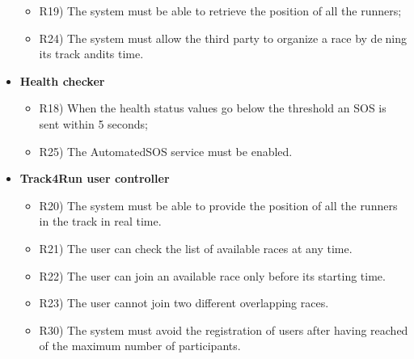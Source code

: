 \begin{itemize}
		\begin{itemize}
			\item R19) The system must be able to retrieve the position of all the runners;\\
			\item R24) The system must allow the third party to organize a race by dening its track andits time.\\
		\end{itemize}
		\item \textbf{Health checker}
		\begin{itemize}
			\item R18) When the health status values go below the threshold an SOS is sent within 5 seconds;\\
			\item R25) The AutomatedSOS service must be enabled.\\
		\end{itemize}
		\item \textbf{Track4Run user controller}
		\begin{itemize}
			\item R20) The system must be able to provide the position of all the runners in the track in real time.\\
			\item R21) The user can check the list of available races at any time.\\
			\item R22) The user can join an available race only before its starting time.\\
			\item R23) The user cannot join two different overlapping races.\\
			\item R30) The system must avoid the registration of users after having reached of the maximum number of participants.\\
		\end{itemize}
	\end{itemize}
	
